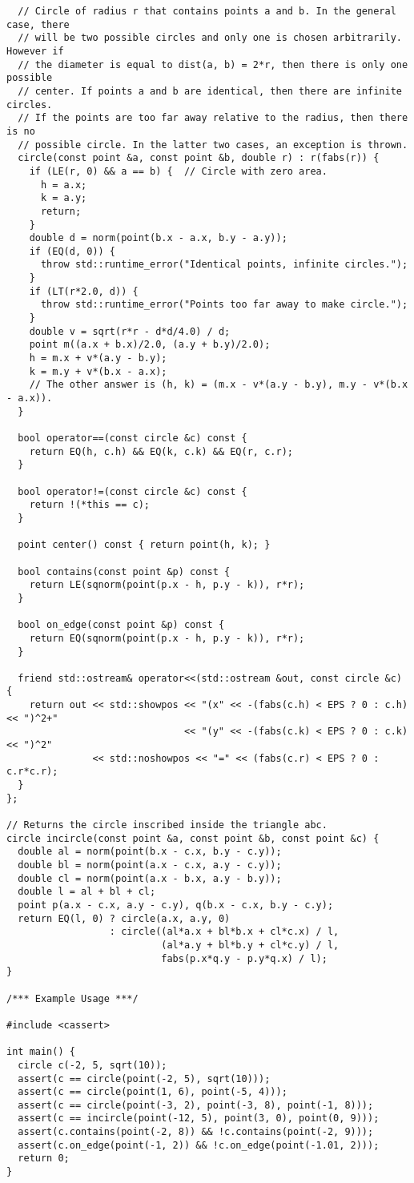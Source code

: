 \begin{lstlisting}
  // Circle of radius r that contains points a and b. In the general case, there
  // will be two possible circles and only one is chosen arbitrarily. However if
  // the diameter is equal to dist(a, b) = 2*r, then there is only one possible
  // center. If points a and b are identical, then there are infinite circles.
  // If the points are too far away relative to the radius, then there is no
  // possible circle. In the latter two cases, an exception is thrown.
  circle(const point &a, const point &b, double r) : r(fabs(r)) {
    if (LE(r, 0) && a == b) {  // Circle with zero area.
      h = a.x;
      k = a.y;
      return;
    }
    double d = norm(point(b.x - a.x, b.y - a.y));
    if (EQ(d, 0)) {
      throw std::runtime_error("Identical points, infinite circles.");
    }
    if (LT(r*2.0, d)) {
      throw std::runtime_error("Points too far away to make circle.");
    }
    double v = sqrt(r*r - d*d/4.0) / d;
    point m((a.x + b.x)/2.0, (a.y + b.y)/2.0);
    h = m.x + v*(a.y - b.y);
    k = m.y + v*(b.x - a.x);
    // The other answer is (h, k) = (m.x - v*(a.y - b.y), m.y - v*(b.x - a.x)).
  }

  bool operator==(const circle &c) const {
    return EQ(h, c.h) && EQ(k, c.k) && EQ(r, c.r);
  }

  bool operator!=(const circle &c) const {
    return !(*this == c);
  }

  point center() const { return point(h, k); }

  bool contains(const point &p) const {
    return LE(sqnorm(point(p.x - h, p.y - k)), r*r);
  }

  bool on_edge(const point &p) const {
    return EQ(sqnorm(point(p.x - h, p.y - k)), r*r);
  }

  friend std::ostream& operator<<(std::ostream &out, const circle &c) {
    return out << std::showpos << "(x" << -(fabs(c.h) < EPS ? 0 : c.h) << ")^2+"
                               << "(y" << -(fabs(c.k) < EPS ? 0 : c.k) << ")^2"
               << std::noshowpos << "=" << (fabs(c.r) < EPS ? 0 : c.r*c.r);
  }
};

// Returns the circle inscribed inside the triangle abc.
circle incircle(const point &a, const point &b, const point &c) {
  double al = norm(point(b.x - c.x, b.y - c.y));
  double bl = norm(point(a.x - c.x, a.y - c.y));
  double cl = norm(point(a.x - b.x, a.y - b.y));
  double l = al + bl + cl;
  point p(a.x - c.x, a.y - c.y), q(b.x - c.x, b.y - c.y);
  return EQ(l, 0) ? circle(a.x, a.y, 0)
                  : circle((al*a.x + bl*b.x + cl*c.x) / l,
                           (al*a.y + bl*b.y + cl*c.y) / l,
                           fabs(p.x*q.y - p.y*q.x) / l);
}

/*** Example Usage ***/

#include <cassert>

int main() {
  circle c(-2, 5, sqrt(10));
  assert(c == circle(point(-2, 5), sqrt(10)));
  assert(c == circle(point(1, 6), point(-5, 4)));
  assert(c == circle(point(-3, 2), point(-3, 8), point(-1, 8)));
  assert(c == incircle(point(-12, 5), point(3, 0), point(0, 9)));
  assert(c.contains(point(-2, 8)) && !c.contains(point(-2, 9)));
  assert(c.on_edge(point(-1, 2)) && !c.on_edge(point(-1.01, 2)));
  return 0;
}
\end{lstlisting}

